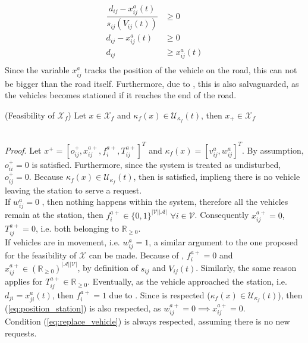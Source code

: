 \begin{align*}
	 \dfrac{d_{ij} - x^a_{ij}(t)}{s_{ij}(V_{ij}(t))} &\ge 0\\
	 d_{ij} - x^a_{ij}(t) &\ge 0\\
	 d_{ij} &\ge x^a_{ij}(t)\\
\end{align*}
Since the variable $x_{ij}^a$ tracks the position of the vehicle on the road, this can not be bigger than the road itself. Furthermore, due to , this is also salvaguarded, as the vehicles becomes stationed if it reaches the end of the road. \\

\begin{proposition}{(Feasibility of $\mathcal{X}_f$)}\label{pro:feas_xf}
	Let $x \in \mathcal{X}_f$ and $\kappa_f(x) \in \mathcal{U}_{\kappa_f}(t)$, then $x_+\in \mathcal{X}_f$
\end{proposition}\\

\textit{Proof}. Let $x^+ = [o_{ij}^+, x_{ij}^{a+}, f^{a+}_{i}, T_{ij}^{a+}]^T$ and $\kappa_f(x) = [v^{a}_{ij}, w^{a}_{ij}]^T$. By assumption, $o_{ii}^+ = 0$ is satisfied. Furthermore, since the system is treated as undisturbed, $o_{ij}^+ = 0$. Because $\kappa_f(x) \in \mathcal{U}_{\kappa_f}(t)$, then  is satisfied, implieng there is no vehicle leaving the station to serve a request. \\
If $w^a_{ij} = 0$ , then nothing happens within the system, therefore all the vehicles remain at the station, then $ f^{a+}_{i} \in \{0,1\}^{|\mathcal{V}||\mathcal{A}|}$ $\forall i \in \mathcal{V}$. Consequently   $x_{ij}^{a+} = 0$, $T_{ij}^{a+}=0$, i.e. both belonging to $\mathbb{R}_{\ge 0}$.\\
If vehicles are in movement, i.e. $w^a_{ij} = 1$, a similar argument to the one proposed for the feasibility of $\mathcal{X}$ can be made. Because of , $f^{a+}_{i}=0$ and $x_{ij}^{a+}\in (\mathbb{R}_{\ge 0})^{|\mathcal{A}||\mathcal{V}|}$, by definition of $s_{ij}$ and $V_{ij}(t)$. Similarly, the same reason applies for $T_{ij}^{a+} \in \mathbb{R}_{\ge0}$. Eventually, as the vehicle approached the station, i.e. $d_{ji} = x^a_{ji}(t)$, then $f^{a+}_{i}=1$ due to . Since 
 is respected ($\kappa_f(x) \in \mathcal{U}_{\kappa_f}(t)$), then  (\ref{eq:position_station}) is also respected, as $ w^{a+}_{ij}=0 \implies x_{ij}^{a+}=0$. \\
Condition (\ref{eq:replace_vehicle}) is always respected, assuming there is no new requests. \\


